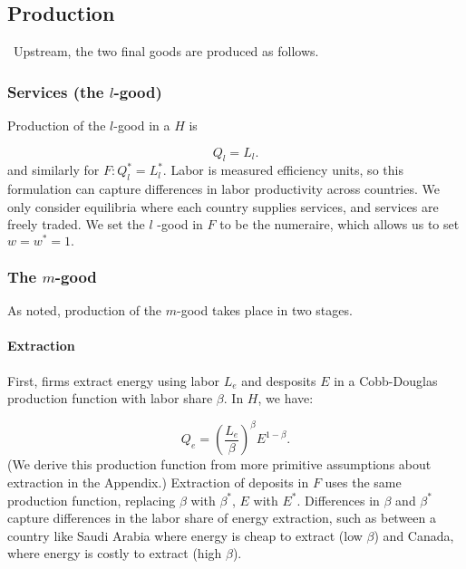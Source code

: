 \documentclass[notitlepage,12pt]{article}
\begin{document}
\subsection{Production}

\ Upstream, the two final goods are produced as follows.

\subsubsection{Services (the $l$-good)}

Production of the $l$-good in a $H$ is

\begin{equation*}
Q_{l}=L_{l}.
\end{equation*}%
and similarly for $F:Q_{l}^{\ast }=L_{l}^{\ast }$. Labor is measured
efficiency units, so this formulation can capture differences in labor
productivity across countries. We only consider equilibria where each
country supplies services, and services are freely traded. We set the $l$%
-good in $F$ to be the numeraire, which allows us to set $w=w^{\ast }=1.$

\subsubsection{The $m$-good}

As noted, production of the $m$-good takes place in two stages.

\paragraph{Extraction}

First, firms extract energy using labor $L_{e}$ and desposits $E$ in a
Cobb-Douglas production function with labor share $\beta $. In $H$, we have:

\begin{equation*}
Q_{e}=\left( \frac{L_{e}}{\beta }\right) ^{\beta }E^{1-\beta }.
\end{equation*}%
(We derive this production function from more primitive assumptions about
extraction in the Appendix.) Extraction of deposits in $F$ uses the same
production function, replacing $\beta $ with $\beta ^{\ast }$, $E$ with $%
E^{\ast }$. Differences in $\beta $ and $\beta ^{\ast }$ capture differences
in the labor share of energy extraction, such as between a country like
Saudi Arabia where energy is cheap to extract (low $\beta $) and Canada,
where energy is costly to extract (high $\beta $).
\end{document}
